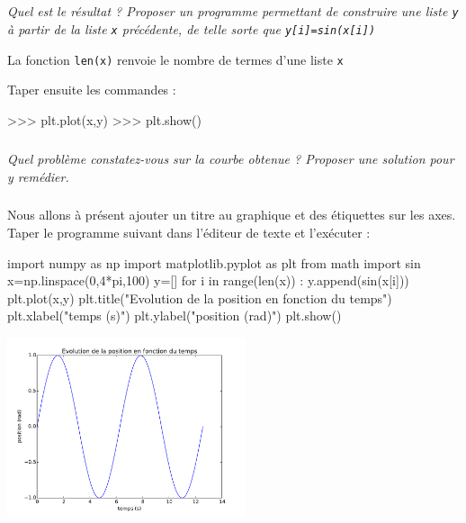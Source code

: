 \documentclass[10pt]{article}
\begin{document}

\subparagraph{}
\textit{Quel est le résultat ? Proposer un programme permettant de construire une liste \texttt{y} à partir de la liste \texttt{x} précédente, de telle sorte que \texttt{y[i]=sin(x[i])}}

\begin{rem}
La fonction \texttt{len(x)} renvoie le nombre de termes d'une  liste \texttt{x}
\end{rem}

Taper ensuite les commandes :
\begin{py}
\begin{python}
>>> plt.plot(x,y)
>>> plt.show()
\end{python}
\end{py}

\subparagraph{}
\textit{Quel problème constatez-vous sur la courbe obtenue ? Proposer une solution pour y remédier.}

\subparagraph{}
Nous allons à présent ajouter un titre au graphique et des étiquettes sur les axes. Taper le programme suivant dans l'éditeur de texte et l'exécuter :
\begin{py}
\begin{python}
import numpy as np
import matplotlib.pyplot as plt
from math import sin
x=np.linspace(0,4*pi,100)
y=[]
for i in range(len(x)) :
	y.append(sin(x[i]))
plt.plot(x,y)
plt.title("Evolution de la position en fonction du temps")
plt.xlabel("temps (s)")
plt.ylabel("position (rad)")
plt.show()
\end{python}
\end{py}

\begin{center}
\includegraphics[width=7cm]{images/figure-sinus.pdf}
\end{center}
\end{document}
